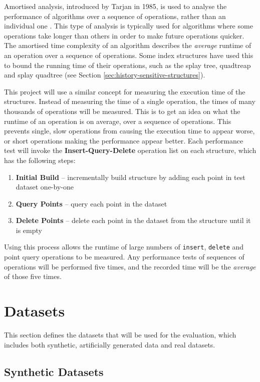 Amortised analysis, introduced by Tarjan in 1985, is used to analyse the performance of algorithms over a sequence of operations, rather than an individual one \cite{amortised-analysis}. This type of analysis is typically used for algorithms where some operations take longer than others in order to make future operations quicker. The amortised time complexity of an algorithm describes the \textit{average} runtime of an operation over a sequence of operations. Some index structures have used this to bound the running time of their operations, such as the splay tree, quadtreap and splay quadtree (see Section \ref{sec:history-sensitive-structures}).

This project will use a similar concept for measuring the execution time of the structures. Instead of measuring the time of a single operation, the times of many thousands of operations will be measured. This is to get an idea on what the runtime of an operation is on average, over a sequence of operations. This prevents single, slow operations from causing the execution time to appear worse, or short operations making the performance appear better. Each performance test will invoke the \textbf{Insert-Query-Delete} operation list on each structure, which has the following steps:
\begin{enumerate}
	\item \textbf{Initial Build} -- incrementally build structure by adding each point in test dataset one-by-one
	\item \textbf{Query Points} -- query each point in the dataset
	\item \textbf{Delete Points} -- delete each point in the dataset from the structure until it is empty
\end{enumerate}
Using this process allows the runtime of large numbers of \texttt{insert}, \texttt{delete} and point query operations to be measured. Any performance tests of sequences of operations will be performed five times, and the recorded time will be the \textit{average} of those five times.

\section{Datasets}
\label{sec:datasets}

This section defines the datasets that will be used for the evaluation, which includes both synthetic, artificially generated data and real datasets.

\subsection{Synthetic Datasets}

